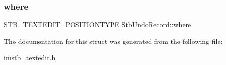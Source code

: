 \subsubsection{\texorpdfstring{where}{where}}
{\footnotesize\ttfamily \mbox{\hyperlink{imstb__textedit_8h_a5d0c1b8751b6517e3d817f2a025ed654}{S\+T\+B\+\_\+\+T\+E\+X\+T\+E\+D\+I\+T\+\_\+\+P\+O\+S\+I\+T\+I\+O\+N\+T\+Y\+PE}} Stb\+Undo\+Record\+::where}



The documentation for this struct was generated from the following file\+:\begin{DoxyCompactItemize}
\item 
\mbox{\hyperlink{imstb__textedit_8h}{imstb\+\_\+textedit.\+h}}\end{DoxyCompactItemize}
